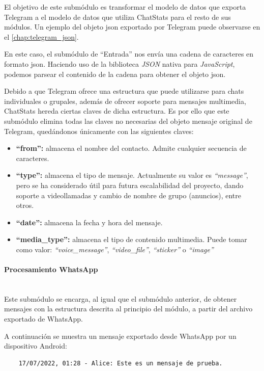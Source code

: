 El objetivo de este submódulo es transformar el modelo de datos que exporta Telegram a el modelo de datos que utiliza ChatStats para el resto de sus módulos. Un ejemplo del objeto \acrshort{json} exportado por Telegram puede observarse en el \autoref{chap:telegram_json}.

En este caso, el submódulo de ``Entrada'' nos envía una cadena de caracteres en formato \acrshort{json}. Haciendo uso de la biblioteca \textit{JSON} nativa para \textit{JavaScript}, podemos parsear el contenido de la cadena para obtener el objeto \acrshort{json}.

Debido a que Telegram ofrece una estructura que puede utilizarse para chats individuales o grupales, además de ofrecer soporte para mensajes multimedia, ChatStats hereda ciertas claves de dicha estructura. Es por ello que este submódulo elimina todas las claves no necesarias del objeto mensaje original de Telegram, quedándonos únicamente con las siguientes claves:

\begin{itemize}
	\item \textbf{``from'':} almacena el nombre del contacto. Admite cualquier secuencia de caracteres.
	\item \textbf{``type'':} almacena el tipo de mensaje. Actualmente su valor es \textit{``message''}, pero se ha considerado útil para futura escalabilidad del proyecto, dando soporte a videollamadas y cambio de nombre de grupo (anuncios), entre otros.
	\item \textbf{``date'':} almacena la fecha y hora del mensaje.
	\item \textbf{``media\_type'':} almacena el tipo de contenido multimedia. Puede tomar como valor: \textit{``voice\_message''}, \textit{``video\_file''}, \textit{``sticker''} o \textit{``image''}
\end{itemize}

\paragraph{Procesamiento WhatsApp}\mbox{}\\

Este submódulo se encarga, al igual que el submódulo anterior, de obtener mensajes con la estructura descrita al principio del módulo, a partir del archivo exportado de WhatsApp.

A continuación se muestra un mensaje exportado desde WhatsApp por un dispositivo Android:

\begin{lstlisting}
	17/07/2022, 01:28 - Alice: Este es un mensaje de prueba.
\end{lstlisting}

